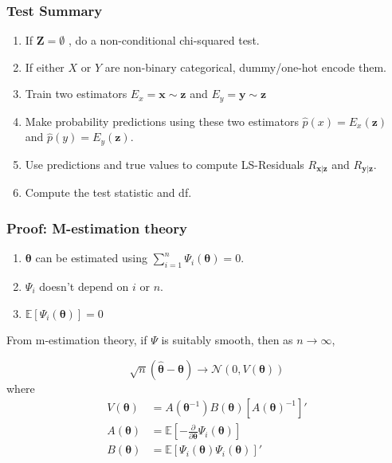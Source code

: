 \documentclass{beamer}
\begin{document}
\begin{frame}
	\frametitle{Test Summary}
	\begin{enumerate}
		\setlength\itemsep{1em}
		\item If $\mathbf{Z} = \emptyset $ , do a non-conditional chi-squared test.
		\item If either $ X $ or $ Y $ are non-binary categorical,
			dummy/one-hot encode them.
		\item Train two estimators $ E_x = \bm{x} \sim \bm{z} $ and
			$ E_y = \bm{y} \sim \bm{z} $
		\item Make probability predictions using these two estimators 
			$ \hat{p}(x) = E_x(\bm{z}) $ and $ \hat{p}(y) =
			E_y(\bm{\bm{z}}) $.
		\item Use predictions and true values to compute LS-Residuals $ R_{\bm{x}|\bm{z}} $ and $ R_{\bm{y}|\bm{z}} $.	
		\item Compute the test statistic and df.
	\end{enumerate}
\end{frame}

\begin{frame}
	\frametitle{Proof: M-estimation theory}
	\begin{enumerate}
		\item $ \bm{\theta} $ can be estimated using $ \sum_{i=1}^n \Psi_i(\bm{\theta}) = 0 $.
		\item $ \Psi_i $ doesn't depend on $ i $ or $ n $.
		\item $ \mathbb{E}[\Psi_i(\bm{\theta})] = 0 $
	\end{enumerate}

	From m-estimation theory, if $ \Psi $ is suitably smooth, then as $ n \to \infty $,

	$$ \sqrt{n}(\hat{\bm{\theta}} - \bm{\theta}) \to \mathcal{N}(0, V(\bm{\theta})) $$
	where 
	\begin{equation*}
		\begin{split}
			V(\bm{\theta}) &= A(\bm{\theta}^{-1}) B(\bm{\theta})[A(\bm{\theta})^{-1}]' \\
			A(\bm{\theta}) &= \mathbb{E} \left[ - \frac{\partial}{\partial \bm{\theta}} \Psi_i(\bm{\theta}) \right] \\ 
			B(\bm{\theta}) &= \mathbb{E}[\Psi_i(\bm{\theta}) \Psi_i(\bm{\theta})]'
		\end{split}
	\end{equation*}

\end{frame}
\end{document}
